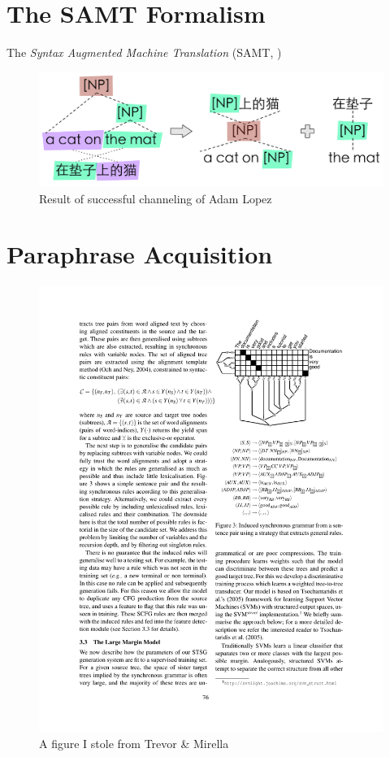 \documentclass[11pt]{article}
\begin{document}
\section{The SAMT Formalism} \label{formalism}

The \emph{Syntax Augmented Machine Translation} (SAMT,
\cite{Zollmann2006})


\begin{figure}
\begin{center}
\includegraphics[width=0.99\linewidth]{figures/scfg.pdf}
\end{center}
\caption{Result of successful channeling of Adam Lopez}
\end{figure}


\section{Paraphrase Acquisition} \label{acquisition}

\begin{figure}
\begin{center}
\includegraphics[width=0.99\linewidth]{figures/tree_placeholder.pdf}
\end{center}
\caption{A figure I stole from Trevor \& Mirella}
\end{figure}
\end{document}
